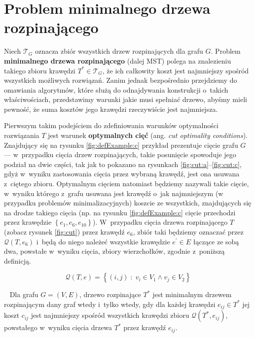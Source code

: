 \section{Problem minimalnego drzewa rozpinającego}\label{sec:mst}




Niech $\mathcal{T}_{G}$ oznacza zbiór wszystkich drzew rozpinających dla grafu $G$.
Problem \textbf{minimalnego drzewa rozpinającego} (dalej \textsc{MST}) polega na znalezieniu takiego zbioru krawędzi $T^{\ast} \in \mathcal{T}_{G}$, że ich całkowity koszt jest najmniejszy spośród wszystkich możliwych rozwiązań.
Zanim jednak bezpośrednio przejdziemy do omawiania algorytmów, które służą do odnajdywania konstrukcji o~takich właściwościach, przedstawimy warunki jakie musi spełniać drzewo, abyśmy mieli pewność, że suma kosztów jego krawędzi rzeczywiście jest najmniejsza.

Pierwszym takim podejściem do zdefiniowania warunków optymalności rozwiązania $T$ jest warunek \textbf{optymalnych cięć} (ang. \textit{cut optimality conditions}).
Znajdujący się na rysunku \ref{fig:defExample:c} przykład prezentuje cięcie grafu $G$ --- w~przypadku cięcia drzew rozpinających, takie posunięcie spowoduje jego podział na dwie części, tak jak to pokazano na rysunkach \ref{fig:cut:a}--\ref{fig:cut:c}, gdyż w~wyniku zastosowania cięcia przez wybraną krawędź, jest ona usuwana z~ciętego zbioru.
Optymalnym cięciem natomiast będziemy nazywali takie cięcie, w~wyniku którego z~grafu usuwana jest krawędź o~jak najmniejszym (w przypadku problemów minimalizacyjnych) koszcie ze wszystkich, znajdujących się na drodze takiego cięcia (np. na rysunku \ref{fig:defExample:c} cięcie przechodzi przez krawędzie $\left\{ e_{1}, e_{6}, e_{10} \right\}$).
W~przypadku cięcia drzewa rozpinającego $T$ (zobacz rysunek \ref{fig:cut}) przez krawędź $e_{6}$, zbiór taki będziemy oznaczać przez $\mathcal{Q} \left( T, e_{6} \right)$ i~będą do niego należeć wszystkie krawędzie $e^{\prime} \in E$ łączące ze sobą dwa, powstałe w~wyniku cięcia, zbiory wierzchołków, zgodnie z~poniższą definicją.

\begin{equation}\label{eq:treecutedgeset}
	\mathcal{Q} \left( T, e \right) = \left\{ \left( i, j \right) \; : \; v_{i} \in V_{1} \wedge v_{j} \in V_{2} \right\}
\end{equation}

\begin{theorem}\label{def:optmstcut}~\cite[$516$--$518$]{Ahuja:1993:NFT:137406}
	Dla grafu $G = \left( V, E \right)$, drzewo rozpinające $T^{\ast}$ jest minimalnym drzewem rozpinającym dany graf wtedy i~tylko wtedy, gdy dla każdej krawędzi $e_{ij} \in T^{\ast}$ jej koszt $c_{ij}$ jest najmniejszy spośród wszystkich krawędzi zbioru $\mathcal{Q} \left( T^{\ast}, e_{ij} \right)$, powstałego w~wyniku cięcia drzewa $T^{\ast}$ przez krawędź $e_{ij}$.
\end{theorem}

